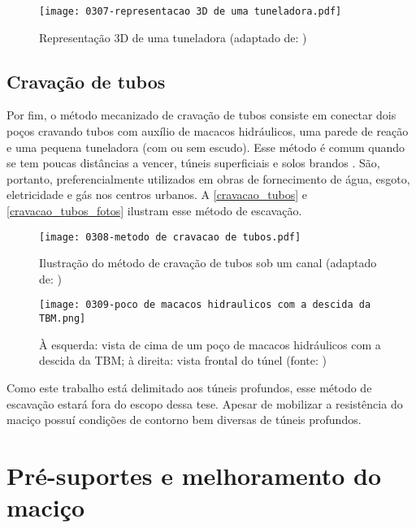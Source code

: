 \begin{figure}[H]
	\begin{center}
		\texttt{[image: 0307-representacao 3D de uma tuneladora.pdf]}
	\end{center}
	\caption{\label{representacao_tuneladora}Representação 3D de uma tuneladora (adaptado de: )}
\end{figure}

\subsection{Cravação de tubos}

Por fim, o método mecanizado de cravação de tubos consiste em conectar dois poços cravando tubos com auxílio de macacos hidráulicos, uma parede de reação e uma pequena tuneladora (com ou sem escudo). Esse método é comum quando se tem poucas distâncias a vencer, túneis superficiais e solos brandos \cite[p. 226]{Chapman2018}. São, portanto, preferencialmente utilizados em obras de fornecimento de água, esgoto, eletricidade e gás nos centros urbanos. A \autoref{cravacao_tubos} e \autoref{cravacao_tubos_fotos} ilustram esse método de escavação.

\begin{figure}[H]
	\begin{center}
		\texttt{[image: 0308-metodo de cravacao de tubos.pdf]}
	\end{center}
	\caption{\label{cravacao_tubos}Ilustração do método de cravação de tubos sob um canal (adaptado de: )}
\end{figure}

\begin{figure}[H]
	\begin{center}
		\texttt{[image: 0309-poco de macacos hidraulicos com a descida da TBM.png]}
	\end{center}
	\caption{\label{cravacao_tubos_fotos}À esquerda: vista de cima de um poço de macacos hidráulicos com a descida da TBM; à direita: vista frontal do túnel (fonte: )}
\end{figure}

Como este trabalho está delimitado aos túneis profundos, esse método de escavação estará fora do escopo dessa tese. Apesar de mobilizar a resistência do maciço possuí condições de contorno bem diversas de túneis profundos.

\section{Pré-suportes e melhoramento do maciço}

